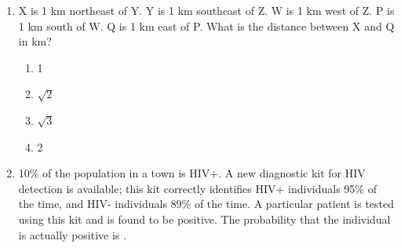 \documentclass[journal,12pt,onecolumn]{IEEEtran}
\theoremstyle{remark}
\begin{document}
\begin{enumerate}
    \item X is 1 km northeast of Y. Y is 1 km southeast of Z. W is 1 km west of Z. P is 1 km south of W. Q is 1 km east of P. What is the distance between X and Q in km?
    \begin{multicols}{4}
        \begin{enumerate}
            \item 1
            \item $\sqrt{2}$
            \item $\sqrt{3}$
            \item 2
        \end{enumerate}
    \end{multicols}
    
    \item 10\% of the population in a town is HIV+. A new diagnostic kit for HIV detection is available; this kit correctly identifies HIV+ individuals 95\% of the time, and HIV- individuals 89\% of the time. A particular patient is tested using this kit and is found to be positive. The probability that the individual is actually positive is \underline{\hspace{2cm}}.

\end{enumerate}

\clearpage
\end{document}

